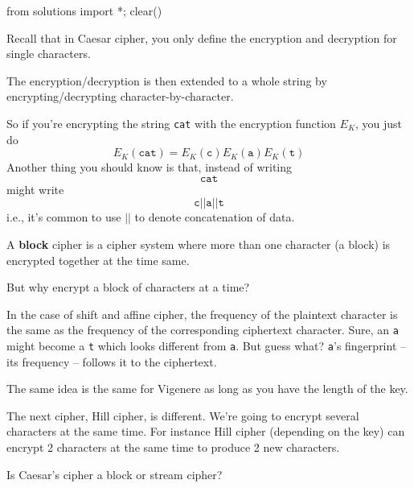 \begin{python0}
from solutions import *; clear()
\end{python0}

Recall that in Caesar cipher, you only define the encryption and decryption
for single characters.

The encryption/decryption is then extended to a whole string by 
encrypting/decrypting character-by-character.

So if you're encrypting the string \verb!cat! with the encryption function
$E_K$, you just do
\[
E_K(\texttt{cat}) = E_K(\texttt{c}) E_K(\texttt{a}) E_K(\texttt{t})
\]
Another thing you should know is that, instead of
writing
\[
\texttt{cat}
\]
might write
\[
\texttt{c} || \texttt{a} || \texttt{t}
\]
i.e., it's common to use $||$ to denote concatenation of data.


A \textbf{block} cipher is a cipher system where more than one
character (a block) is encrypted together at the time same.

But why encrypt a block of characters at a time?

In the case of shift and affine cipher,
the frequency of the plaintext character is the same as the
frequency of the corresponding ciphertext character.
Sure, an \texttt{a} might become a \texttt{t} which looks different from
\texttt{a}.
But guess what?
\texttt{a}'s fingerprint -- its frequency -- follows it to the ciphertext.

The same idea is the same for Vigenere as long as you have
the length of the key.

The next cipher, Hill cipher,  is different.
We're going to encrypt several characters at the same time.
For instance Hill cipher (depending on the key)
can encrypt 2 characters at the same time to produce 2 new characters.

\begin{comment}
On the other hand a \textbf{stream} cipher is one where the key continually
changes for each block, i.e. you might have something like this:
\[
E_{K_1}(\texttt{cat}) =
E_{K_1}(\texttt{c})
E_{K_2}(\texttt{a})
E_{K_3}(\texttt{t})
\]
i.e. you start with key $K_1$, but after using $K_1$ for the first
character, you obtain a second key $K_2$, and use
\textit{that}, etc.
In other words, the encryption process takes in
$\texttt{c}$ and $K_1$ and produces
the encrypted $\texttt{c}$, i.e.,
$E_{K_1}(\texttt{c})$ and also a new key $K_2$, i.e., 
the encryption process also produces keys.
In general, if the plaintext is $x_1 x_2 x_3 \cdots x_n$ 
then $K_i$ is produced from 
\[
x_1, x_2, ..., x_{i-1}, K_1, K_2, ..., K_{i-1}
\]
\end{comment}

\begin{ex}
Is Caesar's cipher a block or stream cipher?
\end{ex}

